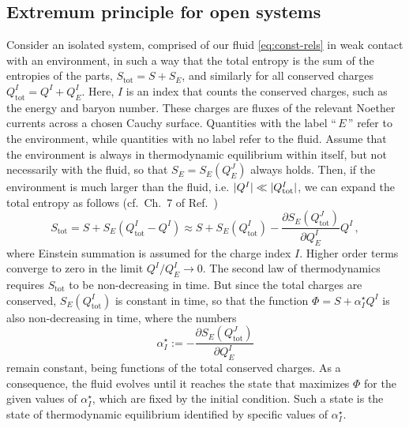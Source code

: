 \documentclass[
a4paper,
amsfonts,
amsmath,
reprint,
showkeys,
nofootinbib,
twoside,
onecolumn,
notitlepage
]{revtex4-1}
\begin{document}
	\subsection{Extremum principle for open systems}\label{sec:open-extr}
	
	
	Consider an isolated system, comprised of our fluid \eqref{eq:const-rels} in weak contact with an environment, in such a way that the total entropy is the sum of the entropies of the parts, $S_{\text{tot}}=S+S_E$, and similarly for all conserved charges $Q^I_{\text{tot}}=Q^I+Q^I_E$. 
	Here, $I$ is an index that counts the conserved charges, such as the energy and baryon number. 
	These charges are fluxes of the relevant Noether currents across a chosen Cauchy surface.
	Quantities with the label ``$\, E \,$'' refer to the environment, while quantities with no label refer to the fluid. 
	Assume that the environment is always in thermodynamic equilibrium within itself, but not necessarily with the fluid, so that $S_E=S_E(Q_E^J)$ always holds.
	Then, if the environment is much larger than the fluid, i.e. $|Q^I| \ll |Q^I_{\rm tot}|$, we can expand the total entropy as follows (cf.\ Ch.\ 7 of Ref.\ \cite{huang_book})
	\begin{equation}
		S_{\text{tot}}= S+S_E(Q^I_{\text{tot}}-Q^I) \approx S+S_E(Q^I_{\text{tot}})- \dfrac{\partial S_E(Q^J_{\text{tot}})}{\partial Q^I_E} Q^I \, ,
	\end{equation}
	where Einstein summation is assumed for the charge index $I$.
	Higher order terms converge to zero in the limit $Q^I/Q^I_E \rightarrow 0$. 
	The second law of thermodynamics requires $S_{\text{tot}}$ to be non-decreasing in time.
	But since the total charges are conserved, $S_E(Q^I_{\text{tot}})$ is constant in time, so that the function $\Phi=S+\alpha^\star_I Q^I$ is also non-decreasing in time, where the numbers
	\begin{equation}\label{lecostantidiequilibrium}
		\alpha^\star_I := -  \dfrac{\partial S_E(Q^J_{\text{tot}})}{\partial Q^I_E}
	\end{equation}
	remain constant, being functions of the total conserved charges. 
	As a consequence, the fluid evolves until it reaches the state that maximizes $\Phi$ for the given values of $\alpha^\star_I$, which are fixed by the initial condition. 
	Such a state is the state of thermodynamic equilibrium identified by specific values of $\alpha^\star_I$.
	
\end{document}

